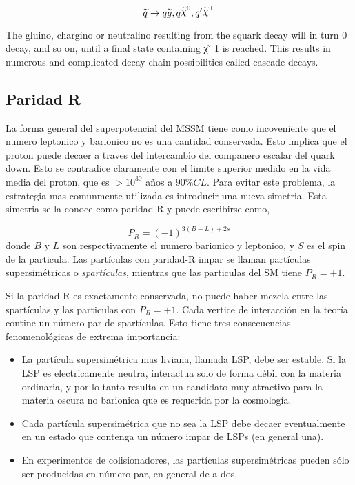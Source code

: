 \begin{equation}
  \susy{q} \to q\gluino, q\nino, q^\prime \chinopm
\end{equation}

The gluino, chargino or neutralino resulting from the squark decay will in turn
0
decay, and so on, until a final state containing χ  ̃ 1 is reached. This results in
numerous and complicated decay chain possibilities called cascade decays.





\subsection{Paridad R}

La forma general del superpotencial del MSSM tiene como incoveniente que
el numero leptonico y barionico no es una cantidad conservada. Esto
implica que el proton puede decaer a traves del intercambio del companero
escalar del quark down. Esto se contradice claramente con el limite superior
medido en la vida media del proton, que es $> 10^30$ a\~nos a $90\% CL$. 
Para evitar este problema, la estrategia mas comunmente utilizada es introducir
una nueva simetria. Esta simetria se la conoce como paridad-R y puede escribirse como,

\begin{equation}
  P_R = (-1)^{3(B-L)+ 2s}
\end{equation}
%
donde $B$ y $L$ son respectivamente el numero barionico y leptonico, y $S$ es
el spin de la particula. Las partículas con paridad-R impar se llaman partículas
supersimétricas o \emph{spartículas}, mientras que las particulas del SM tiene
$P_R = +1$.

Si la paridad-R es exactamente conservada, no puede haber mezcla entre
las spartículas y las particulas con $P_R = +1$. Cada vertice de interacción
en la teoría contine un número par de spartículas.
Esto tiene tres consecuencias fenomenológicas de extrema importancia:

\begin{itemize}
\item La partícula supersimétrica mas liviana, llamada LSP, debe ser estable. Si la LSP es
  electricamente neutra, interactua solo de forma débil con la materia ordinaria, y por lo tanto
  resulta en un candidato muy atractivo para la materia oscura no barionica que es requerida por
  la cosmología.
\item Cada partícula supersimétrica que no sea la LSP debe decaer eventualmente en un estado que
  contenga un número impar de LSPs (en general una).
\item En experimentos de colisionadores, las partículas supersimétricas pueden sólo ser producidas
  en número par, en general de a dos.
\end{itemize}


